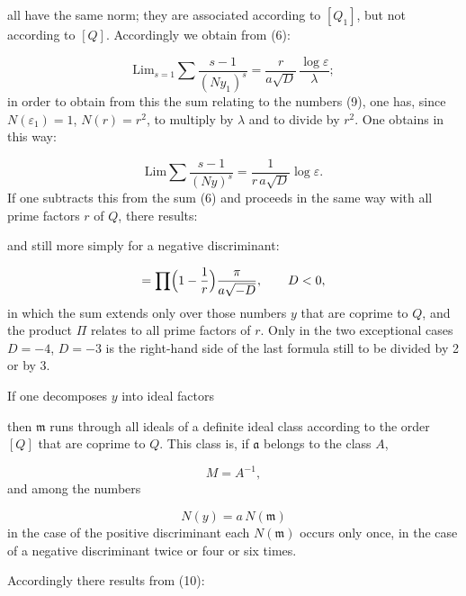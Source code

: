 
all have the same norm; they are associated according to $[Q_1]$, but
not according to $[Q]$. Accordingly we obtain from (6):

\[ \mathrm{Lim}_{s=1}\sum\frac{s-1}{(Ny_1)^s} = \frac{r}{a\sqrt D}\,\frac{\log\varepsilon}{\lambda}; \]
in order to obtain from this the sum relating to the numbers (9),
one has, since $N(\varepsilon_1)=1$, $N(r)=r^2$, to multiply by $\lambda$
and to divide by $r^2$. One obtains in this way:

\[ \mathrm{Lim}\sum\frac{s-1}{(Ny)^s} = \frac{1}{r\,a\sqrt D}\log\varepsilon. \]
If one subtracts this from the sum (6) and proceeds in the same way
with all prime factors $r$ of $Q$, there results:

and still more simply for a negative discriminant:

\[ = \prod\Bigl(1-\frac1r\Bigr)\frac{\pi}{a\sqrt{-D}}, \qquad D<0, \]
in which the sum extends only over those numbers $y$ that are
coprime to $Q$, and the product $\Pi$ relates to all
prime factors of $r$. %
Only in the two exceptional cases
$D=-4$, $D=-3$ is the right-hand side of the last formula
still to be divided by 2 or by 3.

If one decomposes $y$ into ideal factors

then $\mathfrak{m}$ runs through all ideals of a definite ideal class according to
the order $[Q]$ that are coprime to $Q$. This class is,
if $\mathfrak{a}$ belongs to the class $A$,

\[ M = A^{-1}, \]
and among the numbers

\[ N(y) = a\,N(\mathfrak{m}) \]
in the case of the positive discriminant each $N(\mathfrak{m})$ occurs only once,
in the case of a negative discriminant twice or four or
six times.

Accordingly there results from (10):

